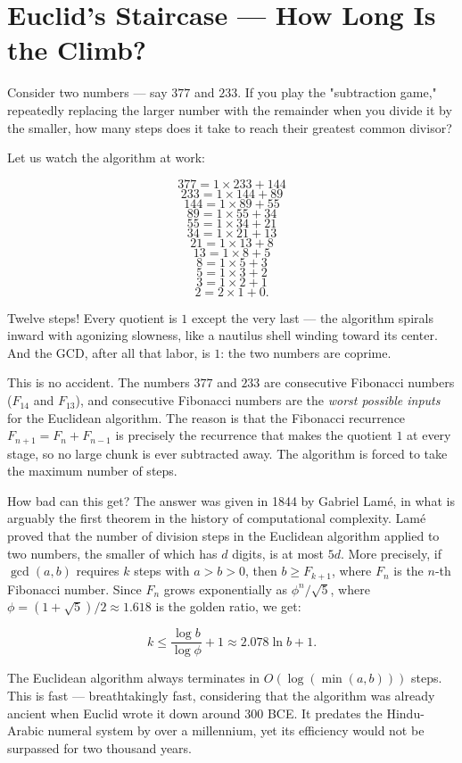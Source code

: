 \documentclass[11pt,openany]{book}
\theoremstyle{definition}
\theoremstyle{plain}
\theoremstyle{remark}
\begin{document}
\section*{Euclid's Staircase — How Long Is the Climb?}


Consider two numbers — say $377$ and $233$. If you play the "subtraction game," repeatedly replacing the larger number with the remainder when you divide it by the smaller, how many steps does it take to reach their greatest common divisor?

Let us watch the algorithm at work:

$$377 = 1 \times 233 + 144$$
$$233 = 1 \times 144 + 89$$
$$144 = 1 \times 89 + 55$$
$$89 = 1 \times 55 + 34$$
$$55 = 1 \times 34 + 21$$
$$34 = 1 \times 21 + 13$$
$$21 = 1 \times 13 + 8$$
$$13 = 1 \times 8 + 5$$
$$8 = 1 \times 5 + 3$$
$$5 = 1 \times 3 + 2$$
$$3 = 1 \times 2 + 1$$
$$2 = 2 \times 1 + 0.$$

Twelve steps! Every quotient is $1$ except the very last — the algorithm spirals inward with agonizing slowness, like a nautilus shell winding toward its center. And the GCD, after all that labor, is $1$: the two numbers are coprime.

This is no accident. The numbers $377$ and $233$ are consecutive Fibonacci numbers ($F_{14}$ and $F_{13}$), and consecutive Fibonacci numbers are the \textit{worst possible inputs} for the Euclidean algorithm. The reason is that the Fibonacci recurrence $F_{n+1} = F_n + F_{n-1}$ is precisely the recurrence that makes the quotient $1$ at every stage, so no large chunk is ever subtracted away. The algorithm is forced to take the maximum number of steps.

How bad can this get? The answer was given in 1844 by Gabriel Lamé, in what is arguably the first theorem in the history of computational complexity. Lamé proved that the number of division steps in the Euclidean algorithm applied to two numbers, the smaller of which has $d$ digits, is at most $5d$. More precisely, if $\gcd(a, b)$ requires $k$ steps with $a > b > 0$, then $b \ge F_{k+1}$, where $F_n$ is the $n$-th Fibonacci number. Since $F_n$ grows exponentially as $\phi^n / \sqrt{5}$, where $\phi = (1 + \sqrt{5})/2 \approx 1.618$ is the golden ratio, we get:

$$k \le \frac{\log b}{\log \phi} + 1 \approx 2.078 \ln b + 1.$$

The Euclidean algorithm always terminates in $O(\log(\min(a, b)))$ steps. This is fast — breathtakingly fast, considering that the algorithm was already ancient when Euclid wrote it down around 300 BCE. It predates the Hindu-Arabic numeral system by over a millennium, yet its efficiency would not be surpassed for two thousand years.
\end{document}
